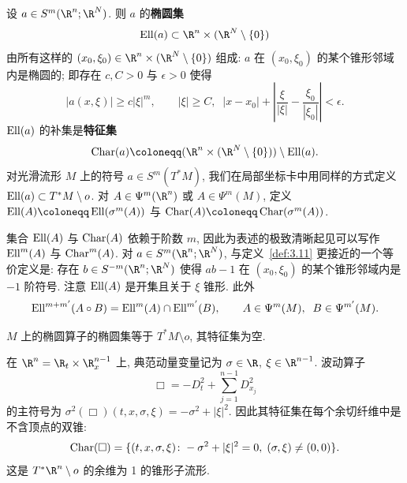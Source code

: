 \begin{definition}[椭圆集]\label{def:6.14}
设 $a \in S^m(\R^n; \R^N)$. 则 $a$ 的\textbf{椭圆集}
\begin{equation}\label{eq:6.11}
    \Ell(a) \subset \R^n \times (\R^N \setminus \{0\})
\end{equation}
由所有这样的 $(x_0, \xi_0) \in \R^n \times (\R^N \setminus \{0\})$ 组成: $a$ 在 $(x_0, \xi_0)$ 的某个锥形邻域内是椭圆的; 即存在 $c, C > 0$ 与 $\epsilon > 0$ 使得
\begin{equation}\label{eq:6.12}
    |a(x, \xi)| \ge c |\xi|^m, \qquad |\xi| \ge C, \;\; |x - x_0| + \left| \frac{\xi}{|\xi|} - \frac{\xi_0}{|\xi_0|} \right| < \epsilon.
\end{equation}
$\operatorname{Ell}(a)$ 的补集是\textbf{特征集}
\begin{equation}\label{eq:6.13}
    \Char(a) \defeq (\R^n \times (\R^N \setminus \{0\})) \setminus \Ell(a).
\end{equation}
对光滑流形 $M$ 上的符号 $a \in S^m(T^* M)$, 我们在局部坐标卡中用同样的方式定义 $\operatorname{Ell}(a) \subset T^* M \setminus o$. 对 $A \in \Psi^m(\R^n)$ 或 $A \in \Psi^m(M)$, 定义 $\Ell(A) \defeq \Ell(\sigma^m(A))$ 与 $\Char(A) \defeq \Char(\sigma^m(A))$.
\end{definition}

集合 $\operatorname{Ell}(A)$ 与 $\operatorname{Char}(A)$ 依赖于阶数 $m$, 因此为表述的极致清晰起见可以写作 $\operatorname{Ell}^m(A)$ 与 $\operatorname{Char}^m(A)$. 对 $a \in S^m(\R^n; \R^N)$, 与定义~\ref{def:3.11} 更接近的一个等价定义是: 存在 $b \in S^{-m}(\R^n; \R^N)$ 使得 $a b - 1$ 在 $(x_0, \xi_0)$ 的某个锥形邻域内是 $-1$ 阶符号. 注意 $\operatorname{Ell}(A)$ 是开集且关于 $\xi$ 锥形. 此外
\begin{equation}\label{eq:6.14}
    \operatorname{Ell}^{m+m'}(A \circ B) = \operatorname{Ell}^m(A) \cap \operatorname{Ell}^{m'}(B), \qquad A \in \Psi^m(M), \;\; B \in \Psi^{m'}(M).
\end{equation}

\begin{example}[椭圆算子]\label{eg:6.15}
$M$ 上的椭圆算子的椭圆集等于 $T^* M \setminus o$, 其特征集为空.
\end{example}

\begin{example}[波动算子]\label{eg:6.16}
在 $\R^n = \R_t \times \R^{n-1}_x$ 上, 典范动量变量记为 $\sigma \in \R$, $\xi \in \R^{n-1}$. 波动算子
\[
    \Box = -D_t^2 + \sum_{j=1}^{n-1} D_{x_j}^2
\]
的主符号为 $\sigma^2(\Box)(t, x, \sigma, \xi) = -\sigma^2 + |\xi|^2$. 因此其特征集在每个余切纤维中是不含顶点的双锥:
\begin{equation}\label{eq:6.15}
    \operatorname{Char}(\Box) = \{(t, x, \sigma, \xi) \colon -\sigma^2 + |\xi|^2 = 0, \; (\sigma, \xi) \neq (0, 0)\}.
\end{equation}
这是 $T^* \R^n \setminus o$ 的余维为 1 的锥形子流形.
\end{example}

